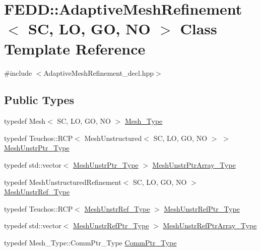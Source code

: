 \hypertarget{classFEDD_1_1AdaptiveMeshRefinement}{}\section{F\+E\+DD\+:\+:Adaptive\+Mesh\+Refinement$<$ SC, LO, GO, NO $>$ Class Template Reference}
\label{classFEDD_1_1AdaptiveMeshRefinement}


{\ttfamily \#include $<$Adaptive\+Mesh\+Refinement\+\_\+decl.\+hpp$>$}

\subsection*{Public Types}
\begin{DoxyCompactItemize}
\item 
typedef Mesh$<$ SC, LO, GO, NO $>$ \hyperlink{classFEDD_1_1AdaptiveMeshRefinement_a7d24de886f92d012c43fbe13d884f08b}{Mesh\+\_\+\+Type}
\item 
typedef Teuchos\+::\+R\+CP$<$ Mesh\+Unstructured$<$ SC, LO, GO, NO $>$ $>$ \hyperlink{classFEDD_1_1AdaptiveMeshRefinement_abc927c0c0253b094c3c53338f9128d20}{Mesh\+Unstr\+Ptr\+\_\+\+Type}
\item 
typedef std\+::vector$<$ \hyperlink{classFEDD_1_1AdaptiveMeshRefinement_abc927c0c0253b094c3c53338f9128d20}{Mesh\+Unstr\+Ptr\+\_\+\+Type} $>$ \hyperlink{classFEDD_1_1AdaptiveMeshRefinement_aae5b66cd506467dbeff01795c41cafcb}{Mesh\+Unstr\+Ptr\+Array\+\_\+\+Type}
\item 
typedef Mesh\+Unstructured\+Refinement$<$ SC, LO, GO, NO $>$ \hyperlink{classFEDD_1_1AdaptiveMeshRefinement_ade0625d6a1aa9c3586f3b04abb0a9e5e}{Mesh\+Unstr\+Ref\+\_\+\+Type}
\item 
typedef Teuchos\+::\+R\+CP$<$ \hyperlink{classFEDD_1_1AdaptiveMeshRefinement_ade0625d6a1aa9c3586f3b04abb0a9e5e}{Mesh\+Unstr\+Ref\+\_\+\+Type} $>$ \hyperlink{classFEDD_1_1AdaptiveMeshRefinement_ad166d4fc2a5e64ed6c4b5ee3941c77bf}{Mesh\+Unstr\+Ref\+Ptr\+\_\+\+Type}
\item 
typedef std\+::vector$<$ \hyperlink{classFEDD_1_1AdaptiveMeshRefinement_ad166d4fc2a5e64ed6c4b5ee3941c77bf}{Mesh\+Unstr\+Ref\+Ptr\+\_\+\+Type} $>$ \hyperlink{classFEDD_1_1AdaptiveMeshRefinement_a9d1410723e7af7a2835cc294934fba65}{Mesh\+Unstr\+Ref\+Ptr\+Array\+\_\+\+Type}
\item 
typedef Mesh\+\_\+\+Type\+::\+Comm\+Ptr\+\_\+\+Type \hyperlink{classFEDD_1_1AdaptiveMeshRefinement_a28759ffaba5c0900ad9ad3b7b185d504}{Comm\+Ptr\+\_\+\+Type}

\end{DoxyCompactItemize}
